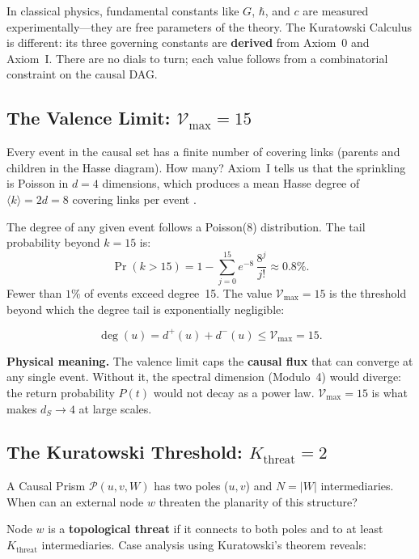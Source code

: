 \documentclass[11pt, a4paper, openany]{book}
\begin{document}
In classical physics, fundamental constants like $G$, $\hbar$, and $c$
are measured experimentally---they are free parameters of the theory.
The Kuratowski Calculus is different: its three governing constants are
\textbf{derived} from Axiom~0 and Axiom~I. There are no dials to turn;
each value follows from a combinatorial constraint on the causal DAG.

\subsection{The Valence Limit: $\mathcal{V}_{\max} = 15$}

Every event in the causal set has a finite number of covering links
(parents and children in the Hasse diagram). How many? Axiom~I tells us
that the sprinkling is Poisson in $d = 4$ dimensions, which produces a
mean Hasse degree of $\langle k\rangle = 2d = 8$ covering links per
event \cite{bombelli1987,rideout2000}.

The degree of any given event follows a Poisson($8$) distribution. The
tail probability beyond $k = 15$ is:
\[
  \Pr(k > 15) = 1 - \sum_{j=0}^{15} e^{-8}\,\frac{8^j}{j!}
  \approx 0.8\%.
\]
Fewer than $1\%$ of events exceed degree~15. The value
$\mathcal{V}_{\max} = 15$ is the threshold beyond which the degree tail
is exponentially negligible:

\begin{equation}\label{eq:valence-limit}
  \deg(u) = d^+(u) + d^-(u) \leq \mathcal{V}_{\max} = 15.
\end{equation}

\noindent
\textbf{Physical meaning.} The valence limit caps the \textbf{causal
flux} that can converge at any single event. Without it, the spectral
dimension (Modulo~4) would diverge: the return probability $P(t)$ would
not decay as a power law. $\mathcal{V}_{\max} = 15$ is what makes
$d_S \to 4$ at large scales.

\subsection{The Kuratowski Threshold: $K_{\mathrm{threat}} = 2$}

A Causal Prism $\mathcal{P}(u, v, W)$ has two poles ($u, v$) and
$N = |W|$ intermediaries. When can an external node $w$ threaten the
planarity of this structure?

Node $w$ is a \textbf{topological threat} if it connects to both poles
and to at least $K_{\mathrm{threat}}$ intermediaries. Case analysis
using Kuratowski's theorem \cite{kuratowski1930} reveals:
\end{document}
